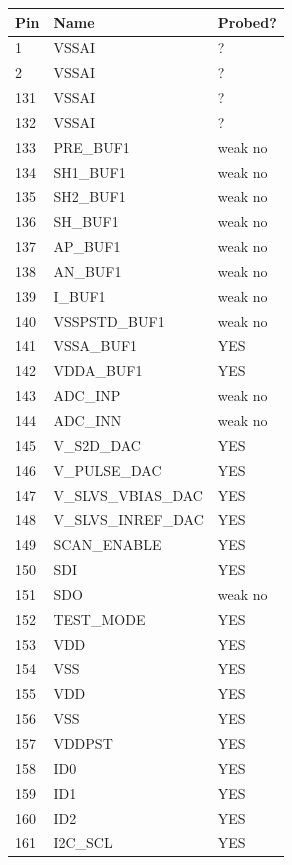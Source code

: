 \documentclass{lhcbnote}
\begin{document}
\begin{longtable}{ | l | l | l | }
\hline
	Pin & Name & Probed? \\ \hline
	1 & VSSAI & ? \\ \hline
	2 & VSSAI & ? \\ \hline
	131 & VSSAI & ? \\ \hline
	132 & VSSAI & ? \\ \hline
	133 & PRE\_BUF1 & weak no \\ \hline
	134 & SH1\_BUF1 & weak no \\ \hline
	135 & SH2\_BUF1 & weak no \\ \hline
	136 & SH\_BUF1 & weak no \\ \hline
	137 & AP\_BUF1 & weak no \\ \hline
	138 & AN\_BUF1 & weak no \\ \hline
	139 & I\_BUF1 & weak no \\ \hline
	140 & VSSPSTD\_BUF1 & weak no \\ \hline
	141 & VSSA\_BUF1 & YES \\ \hline
	142 & VDDA\_BUF1 & YES \\ \hline
	143 & ADC\_INP & weak no \\ \hline
	144 & ADC\_INN & weak no \\ \hline
	145 & V\_S2D\_DAC & YES \\ \hline
	146 & V\_PULSE\_DAC & YES \\ \hline
	147 & V\_SLVS\_VBIAS\_DAC & YES \\ \hline
	148 & V\_SLVS\_INREF\_DAC & YES \\ \hline
	149 & SCAN\_ENABLE & YES \\ \hline
	150 & SDI & YES \\ \hline
	151 & SDO & weak no \\ \hline
	152 & TEST\_MODE & YES \\ \hline
	153 & VDD & YES \\ \hline
	154 & VSS & YES \\ \hline
	155 & VDD & YES \\ \hline
	156 & VSS & YES \\ \hline
	157 & VDDPST & YES \\ \hline
	158 & ID0 & YES \\ \hline
	159 & ID1 & YES \\ \hline
	160 & ID2 & YES \\ \hline
	161 & I2C\_SCL & YES \\ \hline

\end{longtable}
\end{document}
